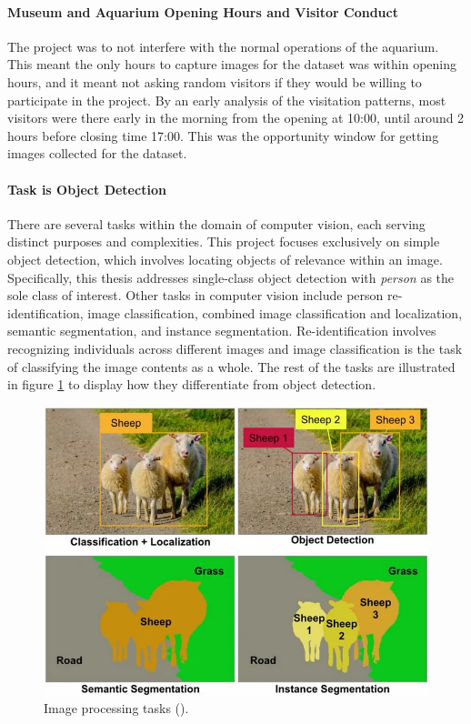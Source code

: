 \paragraph{Museum and Aquarium Opening Hours and Visitor Conduct}
\label{sec:scope_opening_hours}
The project was to not interfere with the normal operations of the aquarium. This meant the only hours to capture images for the dataset was within opening hours, and it meant not asking random visitors if they would be willing to participate in the project. By an early analysis of the visitation patterns, most visitors were there early in the morning from the opening at 10:00, until around 2 hours before closing time 17:00. This was the opportunity window for getting images collected for the dataset.

\paragraph{Task is Object Detection}
\label{sec:scope_object_detection}
There are several tasks within the domain of computer vision, each serving distinct purposes and complexities. This project focuses exclusively on simple object detection, which involves locating objects of relevance within an image. Specifically, this thesis addresses single-class object detection with \textit{person} as the sole class of interest. Other tasks in computer vision include person re-identification, image classification, combined image classification and localization, semantic segmentation, and instance segmentation. Re-identification involves recognizing individuals across different images and image classification is the task of classifying the image contents as a whole. The rest of the tasks are illustrated in figure \ref{fig:computer_vision_tasks} to display how they differentiate from object detection. 

\begin{figure}[H]
    \centering
    \includegraphics[width=0.6\linewidth]{Images/computer_vision_tasks.png}
    \caption{Image processing tasks (\cite{mu2021object_detection_operations}).}
    \label{fig:computer_vision_tasks}
\end{figure}

